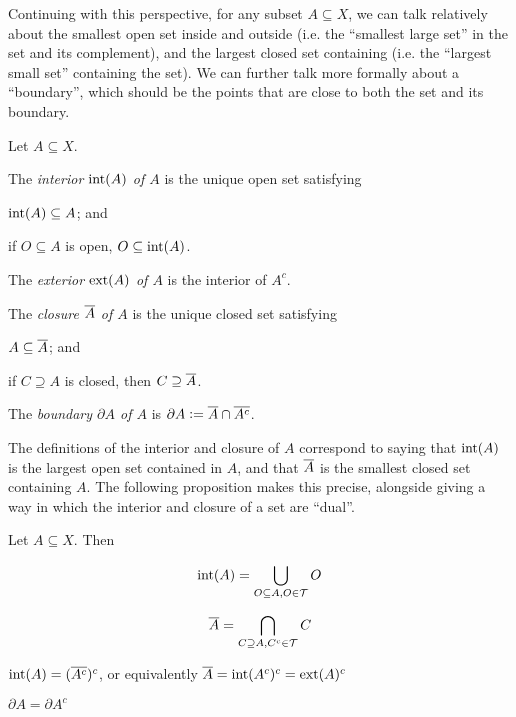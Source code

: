 \documentclass[11pt]{article}
\begin{document}
Continuing with this perspective, for any subset $A \subseteq X$, we can talk relatively about the smallest open set inside and outside (i.e. the ``smallest large set'' in the set and its complement), and the largest closed set containing (i.e. the ``largest small set'' containing the set). We can further talk more formally about a ``boundary'', which should be the points that are close to both the set and its boundary.
\begin{definition}
    Let $A \subseteq X$.
    \begin{enum}
        \item The \emph{interior $\operatorname{int}(A)$ of $A$} is the unique open set satisfying 
        \begin{enum2}
            \item $\operatorname{int}(A) \subseteq A$; and
            \item if $O \subseteq A$ is open, $O \subseteq \operatorname{int}(A)$.
        \end{enum2}
        \item The \emph{exterior $\operatorname{ext}(A)$ of $A$} is the interior of $A^c$.
        \item The \emph{closure $\overline{A}$ of $A$} is the unique closed set satisfying
        \begin{enum2}
            \item $A \subseteq \overline{A}$; and
            \item if $C \supseteq A$ is closed, then $C \supseteq \overline{A}$.
        \end{enum2}
        \item The \emph{boundary $\partial A$ of $A$} is $\partial A \vcentcolon= \overline{A} \cap \overline{A^c}$.
    \end{enum}
\end{definition}
The definitions of the interior and closure of $A$ correspond to saying that $\operatorname{int}(A)$ is the largest open set contained in $A$, and that $\overline{A}$ is the smallest closed set containing $A$. The following proposition makes this precise, alongside giving a way in which the interior and closure of a set are ``dual''.
\begin{proposition}
    Let $A \subseteq X$. Then
    \begin{enum}
        \item $$
            \operatorname{int}(A) = \bigcup_{O \subseteq A, O \in \mathcal{T}} O
        $$
        \item $$
            \overline{A} = \bigcap_{C \supseteq A, C^c \in \mathcal{T}} C
        $$
        \item $\operatorname{int}(A) = (\overline{A^c})^c$, or equivalently $\overline{A} = \operatorname{int}(A^c)^c = \operatorname{ext}(A)^c$
        \item $\partial A = \partial A^c$
    \end{enum}
\end{proposition}
\end{document}
